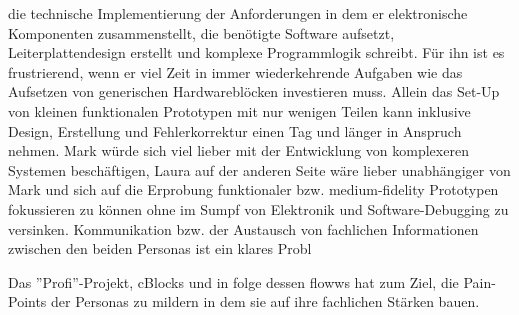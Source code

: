 die technische Implementierung der Anforderungen in dem er elektronische Komponenten zusammenstellt, die benötigte Software aufsetzt, Leiterplattendesign erstellt und komplexe Programmlogik schreibt. Für ihn ist es frustrierend, wenn er viel Zeit in immer wiederkehrende Aufgaben wie das Aufsetzen von generischen Hardwareblöcken investieren muss. Allein das Set-Up von kleinen funktionalen Prototypen mit nur wenigen Teilen kann inklusive Design, Erstellung und Fehlerkorrektur einen Tag und länger in Anspruch nehmen. Mark würde sich viel lieber mit der Entwicklung von komplexeren Systemen beschäftigen, Laura auf der anderen Seite wäre lieber unabhängiger von Mark und sich auf die Erprobung funktionaler bzw. medium-fidelity Prototypen fokussieren zu können ohne im Sumpf von Elektronik und Software-Debugging zu versinken. Kommunikation bzw. der Austausch von fachlichen Informationen zwischen den beiden Personas ist ein klares Probl

Das ''Profi''-Projekt, cBlocks und in folge dessen flowws hat zum Ziel, die Pain-Points der Personas zu mildern in dem sie auf ihre fachlichen Stärken bauen. 